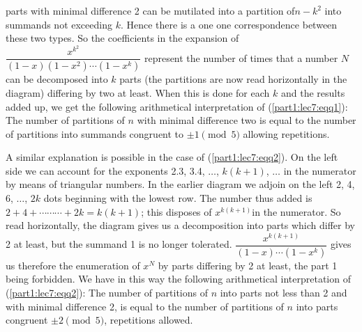 \begin{figure}[H]
\end{figure}
\noindent parts with minimal difference 2 can be mutilated into a partition
of\pageoriginale $n-k^2$ into summands not exceeding $k$. Hence there
is a one one correspondence between these two types. So the
coefficients in the expansion of\break $\dfrac{x^{k^2}}{(1-x)(1-x^2)\cdots
  (1-x^k)}$ represent the number of times that a number $N$ can be
decomposed into $k$ parts (the partitions are now read horizontally in
the diagram) differing by two at least. When this is done for each $k$
and the results added up, we get the following arithmetical
interpretation of (\ref{part1:lec7:eqq1}): The number of partitions of $n$ with minimal
difference two is equal to the number of partitions into summands
congruent to $\pm 1 \pmod{5}$ allowing repetitions. 

A similar explanation is possible in the case of (\ref{part1:lec7:eqq2}). On the left side
we can account for the exponents 2.3, 3.4, $\ldots$, $k(k+1)$,
$\ldots$ in the numerator by means of triangular numbers. In the
earlier diagram we adjoin on the left 2, 4, 6, $\ldots$, $2k$ dots
beginning with the lowest row. The number thus added is $2+4+\cdots
\cdots \cdots + 2k = k(k+1)$; this disposes of $x^{k(k+1)}$in the
  numerator. So read horizontally, the diagram gives us a
  decomposition into parts which differ by 2 at least, but the summand
  1 is no longer tolerated. $\dfrac{x^{k(k+1)}}{(1-x)\cdots (1-x^k)}$
  gives us therefore the enumeration of $x^N$ by parts differing by 2
  at least, the part 1 being forbidden. We have in this way the
  following arithmetical interpretation of (\ref{part1:lec7:eqq2}): The number of
  partitions of $n$ into parts not less than 2 and with minimal
  difference 2, is equal to the number of partitions of $n$ into parts
  congruent $\pm 2 \pmod{5}$, repetitions allowed.


